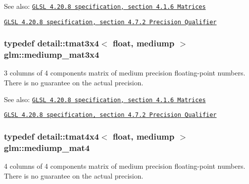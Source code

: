 \begin{Desc}
\item[See also:]\href{http://www.opengl.org/registry/doc/GLSLangSpec.4.20.8.pdf}{\tt GLSL 4.20.8 specification, section 4.1.6 Matrices} 

\href{http://www.opengl.org/registry/doc/GLSLangSpec.4.20.8.pdf}{\tt GLSL 4.20.8 specification, section 4.7.2 Precision Qualifier} \end{Desc}
\hypertarget{group__core__precision_g5654236019c6a732844da31534a3cf28}{
\subsubsection[mediump\_\-mat3x4]{\setlength{\rightskip}{0pt plus 5cm}typedef detail::tmat3x4$<$ float, mediump $>$ {\bf glm::mediump\_\-mat3x4}}}
\label{group__core__precision_g5654236019c6a732844da31534a3cf28}


3 columns of 4 components matrix of medium precision floating-point numbers. There is no guarantee on the actual precision.

\begin{Desc}
\item[See also:]\href{http://www.opengl.org/registry/doc/GLSLangSpec.4.20.8.pdf}{\tt GLSL 4.20.8 specification, section 4.1.6 Matrices} 

\href{http://www.opengl.org/registry/doc/GLSLangSpec.4.20.8.pdf}{\tt GLSL 4.20.8 specification, section 4.7.2 Precision Qualifier} \end{Desc}
\hypertarget{group__core__precision_gf3de9a0400cf707d3c159f32902b92db}{
\subsubsection[mediump\_\-mat4]{\setlength{\rightskip}{0pt plus 5cm}typedef detail::tmat4x4$<$ float, mediump $>$ {\bf glm::mediump\_\-mat4}}}
\label{group__core__precision_gf3de9a0400cf707d3c159f32902b92db}


4 columns of 4 components matrix of medium precision floating-point numbers. There is no guarantee on the actual precision.

